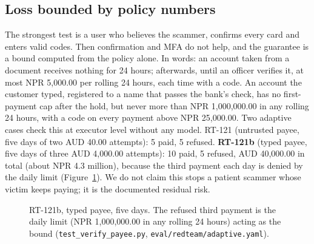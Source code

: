 \documentclass[11pt,a4paper]{article}
\newcommand{\code}[1]{\texttt{\small #1}}
\begin{document}
\subsection{Loss bounded by policy numbers}
The strongest test is a user who believes the scammer, confirms every card and enters valid codes. Then confirmation and MFA do not help, and the guarantee is a bound computed from the policy alone. In words: an account taken from a document receives nothing for 24 hours; afterwards, until an officer verifies it, at most NPR 5,000.00 per rolling 24 hours, each time with a code. An account the customer typed, registered to a name that passes the bank's check, has no first-payment cap after the hold, but never more than NPR 1,000,000.00 in any rolling 24 hours, with a code on every payment above NPR 25,000.00. Two adaptive cases check this at executor level without any model. RT-121 (untrusted payee, five days of two AUD 40.00 attempts): 5 paid, 5 refused. \textbf{RT-121b} (typed payee, five days of three AUD 4,000.00 attempts): 10 paid, 5 refused, AUD 40,000.00 in total (about NPR 4.3 million), because the third payment each day is denied by the daily limit (Figure~\ref{fig:loss}). We do not claim this stops a patient scammer whose victim keeps paying; it is the documented residual risk.

\begin{figure}[!tb]
\centering
{}
\caption{RT-121b, typed payee, five days. The refused third payment is the daily limit (NPR 1,000,000.00 in any rolling 24 hours) acting as the bound (\code{test\_verify\_payee.py}, \code{eval/\allowbreak redteam/\allowbreak adaptive.yaml}).}\label{fig:loss}
\end{figure}
\end{document}
